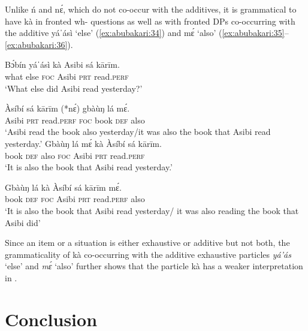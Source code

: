 \documentclass[output=paper,modfonts,nonflat,
\ChapterDOI{10.5281/zenodo.3367154}
 hidelinks
]{langsci/langscibook}
\begin{document}
Unlike ń and nɛ́, which do not co-occur with the  additives, it is grammatical to have kà in fronted wh- questions as well as with fronted DPs co-occurring with the  additive yáˈásì ‘else’  (\ref{ex:abubakari:34}) and mɛ́ ‘also’ (\ref{ex:abubakari:35}--\ref{ex:abubakari:36}).

\ea\label{ex:abubakari:33}
\gll Bɔ́bín		yáˈásì	kà	Asibi	sá	kārīm.\\
what		else	\textsc{foc}	Asibi	\textsc{prt}	read.\textsc{perf}\\
\glt ‘What else did Asibi read yesterday?’
\z

\ea\label{ex:abubakari:34}
\gll Àsíbí		sá	kārīm		(*nɛ́)	gbàùŋ	lá	mɛ́.\\
Asibi	\textsc{prt}	read.\textsc{perf}	\textsc{foc}	book	\textsc{def} also\\
\glt ‘Asibi read the book also yesterday/it was also the book       
                       that Asibi read yesterday.’
\z
\ea\label{ex:abubakari:35}
\gll	Gbàùŋ	lá	mɛ́	kà	Àsíbí	sá	kārīm.\\
book		\textsc{def}	also	\textsc{foc}	Asibi	\textsc{prt}	read.\textsc{perf}\\
\glt ‘It is also the book that Asibi read yesterday.’
\z

\ea\label{ex:abubakari:36}
\gll Gbàùŋ	lá	kà	Àsíbí	sá	kārīm	mɛ́.\\	
book	\textsc{def}	\textsc{foc}	Asibi	\textsc{prt}	read.\textsc{perf}	also\\
\glt ‘It is also the book that Asibi read yesterday/ it was also reading the book that Asibi did’
\z

Since an item or a situation is either exhaustive or additive but not both, the grammaticality of kà co-occurring with the additive exhaustive particles \textit{yá’ás} ‘else’ and \textit{mɛ́} ‘also’ further shows that the particle kà has a weaker  interpretation in . 


\section{Conclusion}
\end{document}
